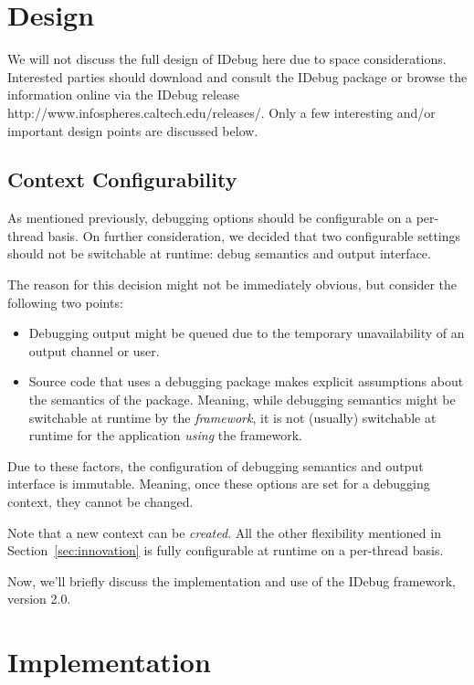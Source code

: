 \documentclass{article}
\begin{document}
\section{Design}

We will not discuss the full design of IDebug here due to space
considerations.  Interested parties should download and consult the
IDebug package or browse the information online via the IDebug release
{http://www.infospheres.caltech.edu/releases/}.  Only a few
interesting and/or important design points are discussed below.

\subsection{Context Configurability}

As mentioned previously, debugging options should be configurable on a
per-thread basis.  On further consideration, we decided that two
configurable settings should not be switchable at runtime: debug
semantics and output interface.

The reason for this decision might not be immediately obvious, but
consider the following two points:
\begin{itemize}
\item Debugging output might be queued due to the temporary
  unavailability of an output channel or user.
\item Source code that uses a debugging package makes explicit
  assumptions about the semantics of the package.  Meaning, while
  debugging semantics might be switchable at runtime by the
  \emph{framework}, it is not (usually) switchable at runtime for the
  application \emph{using} the framework.
\end{itemize}

Due to these factors, the configuration of debugging semantics and
output interface is immutable.  Meaning, once these options are set
for a debugging context, they cannot be changed.

Note that a new context can be \emph{created}.  All the other
flexibility mentioned in Section~\ref{sec:innovation} is fully
configurable at runtime on a per-thread basis.

Now, we'll briefly discuss the implementation and use of the IDebug
framework, version 2.0.

\section{Implementation}
\end{document}
